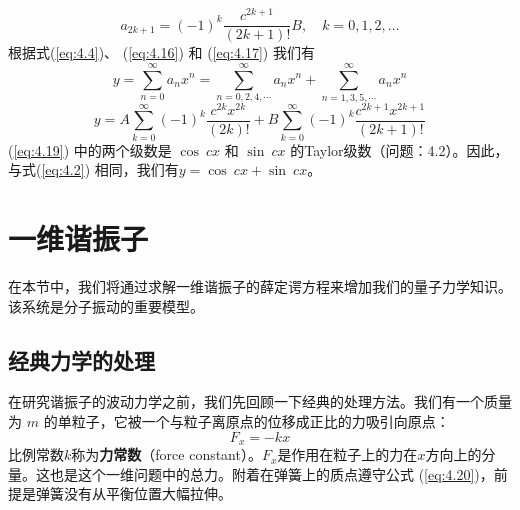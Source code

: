     \begin{equation}
        a_{2k+1} = (-1)^k \frac{c^{2k+1}}{(2k+1)!}B, \quad k = 0, 1, 2, \ldots
        \label{eq:4.17}
    \end{equation}
    根据式(\ref{eq:4.4})、 (\ref{eq:4.16}) 和 (\ref{eq:4.17}) 我们有
    \begin{equation}
        y = \sum_{n=0}^{\infty}a_nx^n = \sum_{n=0,2,4, \cdots}^{\infty}a_nx^n + \sum_{n=1,3,5, \cdots}^{\infty}a_nx^n
        \label{eq:4.18}
    \end{equation}
    \begin{equation}
        y = A\sum_{k=0}^{\infty}(-1)^k\frac{c^{2k}x^{2k}}{(2k)!} + B\sum_{k=0}^{\infty}(-1)^k\frac{c^{2k+1}x^{2k+1}}{(2k+1)!}
        \label{eq:4.19}
    \end{equation}
    (\ref{eq:4.19}) 中的两个级数是 $\cos\: cx$ 和 $\sin\: cx$ 的Taylor级数（问题：4.2）。因此，与式(\ref{eq:4.2}) 相同，我们有$y = \cos\: cx + \sin\: cx$。

\section{一维谐振子}
\label{sec:4.2 The One-Dimensional Harmonic Oscillator}
    在本节中，我们将通过求解一维谐振子的薛定谔方程来增加我们的量子力学知识。该系统是分子振动的重要模型。\\
    
\subsection*{经典力学的处理}
    在研究谐振子的波动力学之前，我们先回顾一下经典的处理方法。我们有一个质量为 $m$ 的单粒子，它被一个与粒子离原点的位移成正比的力吸引向原点：\\
    \begin{equation}
        F_x = -kx
        \label{eq:4.20}
    \end{equation}
    比例常数$k$称为\textbf{力常数}（force constant）。$F_x$是作用在粒子上的力在$x$方向上的分量。这也是这个一维问题中的总力。附着在弹簧上的质点遵守公式 (\ref{eq:4.20})，前提是弹簧没有从平衡位置大幅拉伸。

